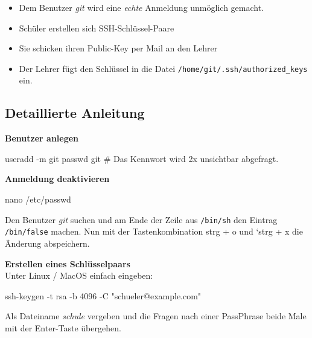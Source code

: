 \documentclass[
  letterpaper,
  DIV=11]{scrreprt}
\newenvironment{Shaded}{\begin{snugshade}}{\end{snugshade}}
\newcommand{\AttributeTok}[1]{\textcolor[rgb]{0.40,0.45,0.13}{#1}}
\newcommand{\CommentTok}[1]{\textcolor[rgb]{0.37,0.37,0.37}{#1}}
\newcommand{\ExtensionTok}[1]{\textcolor[rgb]{0.00,0.23,0.31}{#1}}
\newcommand{\FunctionTok}[1]{\textcolor[rgb]{0.28,0.35,0.67}{#1}}
\newcommand{\NormalTok}[1]{\textcolor[rgb]{0.00,0.23,0.31}{#1}}
\newcommand{\StringTok}[1]{\textcolor[rgb]{0.13,0.47,0.30}{#1}}
\providecommand{\tightlist}{%
  \setlength{\itemsep}{0pt}\setlength{\parskip}{0pt}}\usepackage{longtable,booktabs,array}
\newcommand{\git}{\textit{git}\xspace}
\newcommand{\strg}[1]{strg + #1\xspace}
\begin{document}
\begin{itemize}
\tightlist
\item
  Dem Benutzer \git wird eine \emph{echte} Anmeldung unmöglich gemacht.
\item
  Schüler erstellen sich SSH-Schlüssel-Paare
\item
  Sie schicken ihren Public-Key per Mail an den Lehrer
\item
  Der Lehrer fügt den Schlüssel in die Datei
  \texttt{/home/git/.ssh/authorized\_keys} ein.
\end{itemize}

\subsection{Detaillierte Anleitung}\label{detaillierte-anleitung}

\textbf{Benutzer anlegen}

\begin{Shaded}
\begin{Highlighting}[]
\ExtensionTok{useradd} \AttributeTok{{-}m}\NormalTok{ git}
\FunctionTok{passwd}\NormalTok{ git  }\CommentTok{\# Das Kennwort wird 2x unsichtbar abgefragt.}
\end{Highlighting}
\end{Shaded}

\textbf{Anmeldung deaktivieren}

\begin{Shaded}
\begin{Highlighting}[]
\FunctionTok{nano}\NormalTok{ /etc/passwd }
\end{Highlighting}
\end{Shaded}

Den Benutzer \git  suchen und am Ende der Zeile aus \texttt{/bin/sh} den
Eintrag \texttt{/bin/false} machen. Nun mit der Tastenkombination
\strg{o} und `\strg{x} die Änderung abspeichern.

\textbf{Erstellen eines Schlüsselpaars}\\
Unter Linux / MacOS einfach eingeben:

\begin{Shaded}
\begin{Highlighting}[]
\FunctionTok{ssh{-}keygen} \AttributeTok{{-}t}\NormalTok{ rsa }\AttributeTok{{-}b}\NormalTok{ 4096 }\AttributeTok{{-}C} \StringTok{"schueler@example.com"}
\end{Highlighting}
\end{Shaded}

Als Dateiname \emph{schule} vergeben und die Fragen nach einer
PassPhrase beide Male mit der Enter-Taste übergehen.
\end{document}
